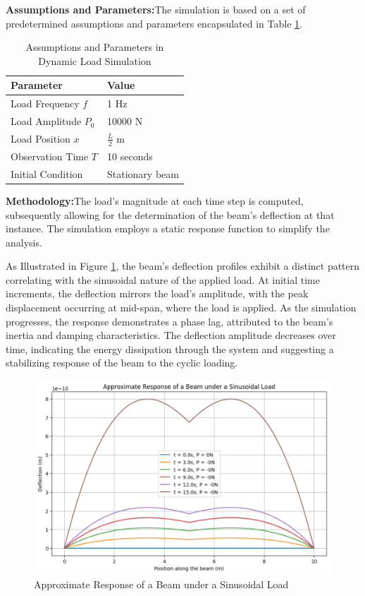 \documentclass[conference]{IEEEtran}
\begin{document}
\textbf{Assumptions and Parameters:}The simulation is based on a set of predetermined assumptions and parameters encapsulated in Table \ref{tab4}.

\begin{table}[ht]
\centering
\caption{Assumptions and Parameters in Dynamic Load Simulation}
\label{tab4}
\begin{tabular}{l l}
\hline
\textbf{Parameter} & \textbf{Value} \\
\hline
Load Frequency \( f \) & 1 Hz \\
Load Amplitude \( P_0 \) & 10000 N \\
Load Position \( x \) & \( \frac{L}{2} \) m \\
Observation Time \( T \) & 10 seconds \\
Initial Condition & Stationary beam \\
\hline
\end{tabular}
\end{table}

\textbf{Methodology:}The load's magnitude at each time step is computed, subsequently allowing for the determination of the beam's deflection at that instance. The simulation employs a static response function to simplify the analysis.

As Illustrated in Figure \ref{fig:sinusoidalLoad}, the beam's deflection profiles exhibit a distinct pattern correlating with the sinusoidal nature of the applied load. At initial time increments, the deflection mirrors the load's amplitude, with the peak displacement occurring at mid-span, where the load is applied. As the simulation progresses, the response demonstrates a phase lag, attributed to the beam's inertia and damping characteristics. The deflection amplitude decreases over time, indicating the energy dissipation through the system and suggesting a stabilizing response of the beam to the cyclic loading.

\begin{figure}[h]
\centering
\includegraphics[width=0.88\linewidth]{5.png}
\caption{Approximate Response of a Beam under a Sinusoidal Load}
\label{fig:sinusoidalLoad}
\end{figure}
\end{document}
